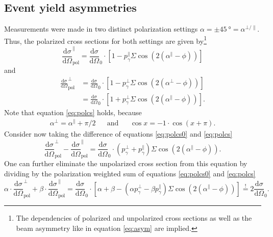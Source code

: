 \subsection{Event yield asymmetries}
\label{subsec:evyield}
Measurements were made in two distinct polarization settings $\alpha=\pm\SI{45}{\degree}=\alpha^{\bot/\parallel}$. Thus, the polarized cross sections for both settings are given by\footnote{The dependencies of polarized and unpolarized cross sections as well as the beam asymmetry like in equation \eqref{eq:asym} are implied.}
\begin{equation}
	\frac{\text{d}\sigma}{\text{d}\Omega}_\text{pol}^\parallel=\frac{\text{d}\sigma}{\text{d}\Omega}_0\cdot\left[1-p_\gamma^\parallel\Sigma\cos\left(2\left(\alpha^\parallel-\phi\right)\right)\right]
	\label{eq:polcs0}
\end{equation}
and 
\begin{align}
	\frac{\text{d}\sigma}{\text{d}\Omega}_\text{pol}^\bot&=\frac{\text{d}\sigma}{\text{d}\Omega}_0\cdot\left[1-p_\gamma^\bot\Sigma\cos\left(2\left(\alpha^\bot-\phi\right)\right)\right]\label{eq:polcs00}\\
	&=\frac{\text{d}\sigma}{\text{d}\Omega}_0\cdot\left[1+p_\gamma^\bot\Sigma\cos\left(2\left(\alpha^\parallel-\phi\right)\right)\right].\label{eq:polcs}
\end{align}
Note that equation \eqref{eq:polcs} holds, because 
\begin{align*}
	\alpha^\bot=\alpha^\parallel+\pi/2 &&\text{and}&&\cos x = -1\cdot\cos(x+\pi).
\end{align*}
Consider now taking the difference of equations \eqref{eq:polcs0} and \eqref{eq:polcs}
\begin{equation}
	\frac{\text{d}\sigma}{\text{d}\Omega}_\text{pol}^\bot-\frac{\text{d}\sigma}{\text{d}\Omega}_\text{pol}^\parallel=\frac{\text{d}\sigma}{\text{d}\Omega}_0\cdot\left(p_\gamma^\bot+p_\gamma^\parallel\right)\Sigma\cos\left(2\left(\alpha^\parallel-\phi\right)\right).
\end{equation}
One can further eliminate the unpolarized cross section from this equation by dividing by the polarization weighted sum of equations \eqref{eq:polcs0} and \eqref{eq:polcs}
\begin{equation}
	\alpha\cdot\frac{\text{d}\sigma}{\text{d}\Omega}_\text{pol}^\bot+\beta\cdot\frac{\text{d}\sigma}{\text{d}\Omega}_\text{pol}^\parallel=\frac{\text{d}\sigma}{\text{d}\Omega}_0\cdot\left[\alpha+\beta-\left(\alpha p_\gamma^\bot-\beta p_\gamma^\parallel\right)\Sigma\cos\left(2\left(\alpha^\parallel-\phi\right)\right)\right]\overset{!}{=}2\frac{\text{d}\sigma}{\text{d}\Omega}_0.
\end{equation}
